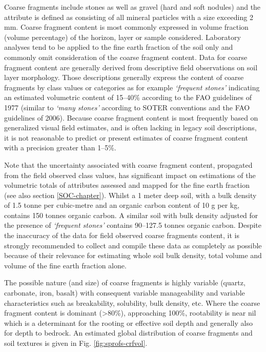 \documentclass[graybox,natbib,nospthms,UStrade]{svmono}
\begin{document}
Coarse fragments include stones as well as gravel (hard and soft
nodules) and the attribute is defined as consisting of all mineral
particles with a size exceeding 2 mm. Coarse fragment content is most
commonly expressed in volume fraction (volume percentage) of the
horizon, layer or sample considered. Laboratory analyses tend to be
applied to the fine earth fraction of the soil only and commonly omit
consideration of the coarse fragment content. Data for coarse fragment
content are generally derived from descriptive field observations on
soil layer morphology. Those descriptions generally express the content
of coarse fragments by class values or categories as for example
\emph{`frequent stones'} indicating an estimated volumetric content of 15--40\% according to
the FAO guidelines of 1977 (similar to \emph{`many stones'} according to
SOTER conventions and the FAO guidelines of 2006). Because coarse
fragment content is most frequently based on generalized visual field
estimates, and is often lacking in legacy soil descriptions, it is not
reasonable to predict or present estimates of coarse fragment content
with a precision greater than 1--5\%.

Note that the uncertainty associated with coarse fragment content,
propagated from the field observed class values, has significant impact
on estimations of the volumetric totals of attributes assessed and
mapped for the fine earth fraction (see also
section \ref{SOC-chapter}). Whilst a 1 meter deep
soil, with a bulk density of 1.5 tonne per cubic-metre and an organic
carbon content of 10 g per kg, contains 150 tonnes organic carbon.
A similar soil with bulk density adjusted for the
presence of \emph{`frequent stones'} contains 90--127.5 tonnes organic carbon. Despite the
inaccuracy of the data for field observed coarse fragments content, it is
strongly recommended to collect and compile these data as completely as
possible because of their relevance for estimating whole soil bulk
density, total volume and volume of the fine earth fraction alone.

The possible nature (and size) of coarse fragments is highly variable
(quartz, carbonate, iron, basalt) with consequent variable manageability and
variable characteristics such as breakability, solubility, bulk density, etc.
Where the coarse fragment content is dominant (\textgreater{}80\%), approaching 100\%,
rootability is near nil which is a determinant for the rooting or
effective soil depth and generally also for depth to bedrock. An
estimated global distribution of coarse fragments and soil textures is
given in Fig. \ref{fig:sprofs-crfvol}.
\end{document}
